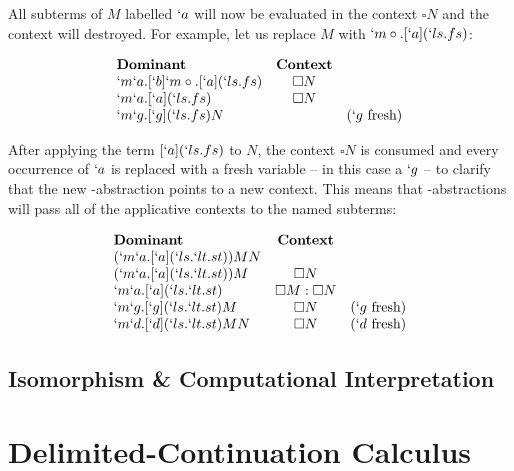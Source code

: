   All subterms of $M$ labelled $`a$ will now be evaluated in the context 
  $\square N$ and the context will destroyed. For example, let us replace 
  $M$ with \mbox{$`m\circ.[`a](`ls.fs)$}:
  
  \begin{example}
    \[
    \begin{array}{lcr}
    \textbf{Dominant} & \textbf{Context} \\
    `m`a.[`b]`m\circ.[`a](`ls.fs)    & \square N \\
    `m`a.[`a](`ls.fs)    & \square N \\
    `m`g.[`g](`ls.fs)N   & & (`g\ \text{fresh})  \\
    \end{array}
    \]
  \end{example}

  After applying the term $[`a](`ls.fs)$ to $N$, the context $\square N$
  is consumed and every occurrence of $`a$ is replaced with a fresh 
  variable -- in this case a $`g$ -- to clarify that the new 
  \lmu-abstraction points to a new context. This means that 
  \lmu-abstractions will pass all of the applicative contexts to the
  named subterms:
  
  \begin{example}
    \[
    \begin{array}{lcr}
    \textbf{Dominant} & \textbf{Context} \\
    (`m`a.[`a](`ls.`lt.st)) M N \\
    (`m`a.[`a](`ls.`lt.st))M & \square N \\
    `m`a.[`a](`ls.`lt.st) & \square M:\square N \\
    `m`g.[`g](`ls.`lt.st)M & \square N & (`g\ \text{fresh}) \\
    `m`d.[`d](`ls.`lt.st)MN & \square N & (`d\ \text{fresh}) \\
    \end{array}
    \]
  \end{example}
  
  \subsection{Isomorphism \& Computational Interpretation}

\section{Delimited-Continuation Calculus}

